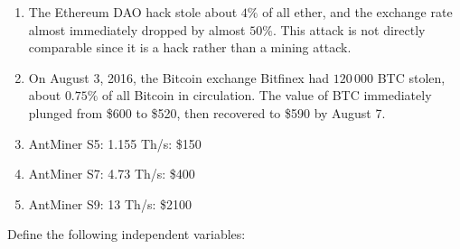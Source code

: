 \documentclass[12pt]{article}
\begin{document}
\begin{enumerate}
  \item
    The Ethereum DAO hack stole about $4\%$ of all ether, and the exchange rate
    almost immediately dropped by almost $50\%$.
    This attack is not directly comparable since it is a hack rather than a
    mining attack.
  \item
    On August 3, 2016, the Bitcoin exchange Bitfinex had $120\,000$ BTC stolen, about $0.75\%$ of all Bitcoin in circulation. The value of BTC immediately plunged from \$600 to \$520, then recovered to \$590 by August 7.
  \item
    AntMiner S5: 1.155 Th/s: \$150
  \item
    AntMiner S7: 4.73 Th/s: \$400
  \item
    AntMiner S9: 13 Th/s: \$2100
\end{enumerate}

Define the following independent variables:
\end{document}
